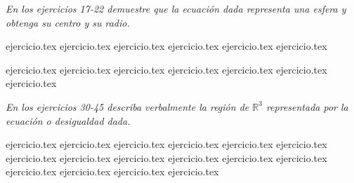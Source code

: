 \vspace{0.5cm}
\noindent\textit{En los ejercicios 17-22 demuestre que la ecuación dada representa una esfera y obtenga su centro y su radio.}

\begin{enumerate}
    \setcounter{enumi}{16}
    {ejercicio.tex}
{ejercicio.tex}
{ejercicio.tex}
{ejercicio.tex}
{ejercicio.tex}
{ejercicio.tex}
\end{enumerate}

\vspace{0.3cm}
\begin{enumerate}
    \setcounter{enumi}{22}
    {ejercicio.tex}
{ejercicio.tex}
{ejercicio.tex}
{ejercicio.tex}
{ejercicio.tex}
{ejercicio.tex}
{ejercicio.tex}
\end{enumerate}

\vspace{0.5cm}
\noindent\textit{En los ejercicios 30-45 describa verbalmente la región de $\mathbb{R}^3$ representada por la ecuación o desigualdad dada.}

\begin{enumerate}
    \setcounter{enumi}{29}
    {ejercicio.tex}
{ejercicio.tex}
{ejercicio.tex}
{ejercicio.tex}
{ejercicio.tex}
{ejercicio.tex}
{ejercicio.tex}
{ejercicio.tex}
{ejercicio.tex}
{ejercicio.tex}
{ejercicio.tex}
{ejercicio.tex}
{ejercicio.tex}
{ejercicio.tex}
{ejercicio.tex}
{ejercicio.tex}
\end{enumerate}
